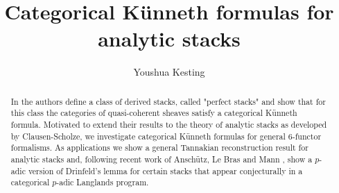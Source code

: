 \documentclass{article}
\title{Categorical K\"unneth formulas for analytic stacks}
\author{Youshua Kesting}
\theoremstyle{definition}
\theoremstyle{definition}\newtheorem{definition}[theorem]{Definition}
\numberwithin{equation}{theorem}
\begin{document}
\maketitle

\begin{abstract}
In \Cite{ben2010integral} the authors define a class of derived stacks, called "perfect stacks" and show that for this class the categories of quasi-coherent sheaves satisfy a categorical Künneth formula. Motivated to extend their results to the theory of analytic stacks as developed by Clausen-Scholze, we investigate categorical Künneth formulas for general $6$-functor formalisms.  As applications we show a general Tannakian reconstruction result for analytic stacks and, following recent work of Anschütz, Le Bras and Mann \Cite{anschütz20246functorformalismsolidquasicoherent}, show a $p$-adic version of Drinfeld's lemma for certain stacks that appear conjecturally in a categorical $p$-adic Langlands program.
\end{abstract}


\tableofcontents
\newpage


\newpage



\newpage



\newpage


\printbibliography
\end{document}
